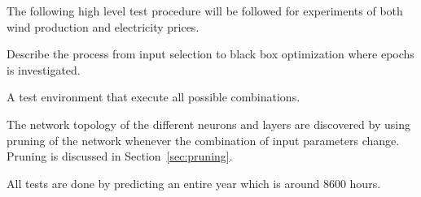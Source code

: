 The following high level test procedure will be followed for experiments of both wind production and electricity prices. 

Describe the process from input selection to black box optimization where epochs is investigated.

A test environment that execute all possible combinations. 

The network topology of the different neurons and layers are discovered by using pruning of the network whenever the combination of input parameters change. Pruning is discussed in Section~\ref{sec:pruning}.

All tests are done by predicting an entire year which is around 8600 hours.

